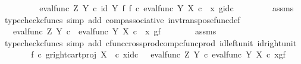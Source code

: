 \begin{isabellebody}
\ \ \ \ \isamarkupfalse%
\ \isamarkupfalse%
\ {\isachardoublequoteopen}{\isachardot}{\kern0pt}{\isachardot}{\kern0pt}{\isachardot}{\kern0pt}\ {\isacharequal}{\kern0pt}\ {\isacharparenleft}{\kern0pt}eval{\isacharunderscore}{\kern0pt}func\ Z\ Y{\isacharparenright}{\kern0pt}\ {\isasymcirc}\isactrlsub c\ {\isacharparenleft}{\kern0pt}id\ Y\ {\isasymtimes}\isactrlsub f\ f{\isacharparenright}{\kern0pt}\ {\isasymcirc}\isactrlsub c\ {\isasymlangle}{\isacharparenleft}{\kern0pt}eval{\isacharunderscore}{\kern0pt}func\ Y\ X{\isacharparenright}{\kern0pt}\ {\isasymcirc}\isactrlsub c\ \ {\isasymlangle}x{\isacharcomma}{\kern0pt}\ g{\isasymrangle}{\isacharcomma}{\kern0pt}id\isactrlsub c\ {\isasymone}{\isasymrangle}{\isachardoublequoteclose}\isanewline
\ \ \ \ \ \ \isamarkupfalse%
\ assms\ \isamarkupfalse%
\ {\isacharparenleft}{\kern0pt}typecheck{\isacharunderscore}{\kern0pt}cfuncs{\isacharcomma}{\kern0pt}\ simp\ add{\isacharcolon}{\kern0pt}\ comp{\isacharunderscore}{\kern0pt}associative{}\ inv{\isacharunderscore}{\kern0pt}transpose{\isacharunderscore}{\kern0pt}func{\isacharunderscore}{\kern0pt}def{}{\isacharparenright}{\kern0pt}\isanewline
\ \ \ \ \isamarkupfalse%
\ \isamarkupfalse%
\ {\isachardoublequoteopen}{\isachardot}{\kern0pt}{\isachardot}{\kern0pt}{\isachardot}{\kern0pt}\ {\isacharequal}{\kern0pt}\ {\isacharparenleft}{\kern0pt}eval{\isacharunderscore}{\kern0pt}func\ Z\ Y{\isacharparenright}{\kern0pt}\ {\isasymcirc}\isactrlsub c\ \ {\isasymlangle}{\isacharparenleft}{\kern0pt}eval{\isacharunderscore}{\kern0pt}func\ Y\ X{\isacharparenright}{\kern0pt}\ {\isasymcirc}\isactrlsub c\ \ {\isasymlangle}x{\isacharcomma}{\kern0pt}\ g{\isasymrangle}{\isacharcomma}{\kern0pt}f{\isasymrangle}{\isachardoublequoteclose}\isanewline
\ \ \ \ \ \ \isamarkupfalse%
\ assms\ \isamarkupfalse%
\ {\isacharparenleft}{\kern0pt}typecheck{\isacharunderscore}{\kern0pt}cfuncs{\isacharcomma}{\kern0pt}\ simp\ add{\isacharcolon}{\kern0pt}\ cfunc{\isacharunderscore}{\kern0pt}cross{\isacharunderscore}{\kern0pt}prod{\isacharunderscore}{\kern0pt}comp{\isacharunderscore}{\kern0pt}cfunc{\isacharunderscore}{\kern0pt}prod\ id{\isacharunderscore}{\kern0pt}left{\isacharunderscore}{\kern0pt}unit{}\ id{\isacharunderscore}{\kern0pt}right{\isacharunderscore}{\kern0pt}unit{}{\isacharparenright}{\kern0pt}\isanewline
\ \ \ \ \isamarkupfalse%
\ \isamarkupfalse%
\ {\isachardoublequoteopen}{\isacharparenleft}{\kern0pt}f\isactrlsup {\isasymflat}\ {\isasymcirc}\isactrlsub c\ {\isasymlangle}g\isactrlsup {\isasymflat}{\isacharcomma}{\kern0pt}right{\isacharunderscore}{\kern0pt}cart{\isacharunderscore}{\kern0pt}proj\ X\ {\isasymone}{\isasymrangle}{\isacharparenright}{\kern0pt}\ {\isasymcirc}\isactrlsub c\ {\isasymlangle}x{\isacharcomma}{\kern0pt}id\isactrlsub c\ {\isasymone}{\isasymrangle}\ {\isacharequal}{\kern0pt}\ eval{\isacharunderscore}{\kern0pt}func\ Z\ Y\ {\isasymcirc}\isactrlsub c\ {\isasymlangle}eval{\isacharunderscore}{\kern0pt}func\ Y\ X\ {\isasymcirc}\isactrlsub c\ {\isasymlangle}x{\isacharcomma}{\kern0pt}g{\isasymrangle}{\isacharcomma}{\kern0pt}f{\isasymrangle}{\isachardoublequoteclose}\isacommand{{\isachardot}{\kern0pt}}\isamarkupfalse%

\end{isabellebody}
